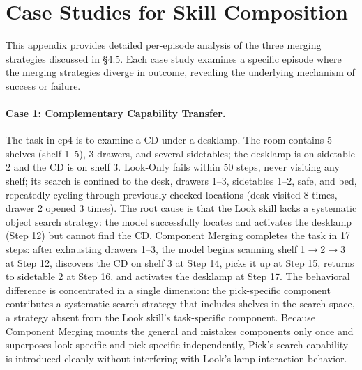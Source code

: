 \documentclass{llmxive}
\begin{document}
\section{Case Studies for Skill Composition}
\label{app:case_study}

This appendix provides detailed per-episode analysis of the three merging strategies discussed in \S4.5. Each case study examines a specific episode where the merging strategies diverge in outcome, revealing the underlying mechanism of success or failure.

\paragraph{Case 1: Complementary Capability Transfer.}
The task in ep4 is to examine a CD under a desklamp. The room contains 5 shelves (shelf 1--5), 3 drawers, and several sidetables; the desklamp is on sidetable 2 and the CD is on shelf 3. Look-Only fails within 50 steps, never visiting any shelf; its search is confined to the desk, drawers 1--3, sidetables 1--2, safe, and bed, repeatedly cycling through previously checked locations (desk visited 8 times, drawer 2 opened 3 times). The root cause is that the Look skill lacks a systematic object search strategy: the model successfully locates and activates the desklamp (Step 12) but cannot find the CD. Component Merging completes the task in 17 steps: after exhausting drawers 1--3, the model begins scanning shelf 1$\rightarrow$2$\rightarrow$3 at Step 12, discovers the CD on shelf 3 at Step 14, picks it up at Step 15, returns to sidetable 2 at Step 16, and activates the desklamp at Step 17. The behavioral difference is concentrated in a single dimension: the pick-specific component contributes a systematic search strategy that includes shelves in the search space, a strategy absent from the Look skill's task-specific component. Because Component Merging mounts the general and mistakes components only once and superposes look-specific and pick-specific independently, Pick's search capability is introduced cleanly without interfering with Look's lamp interaction behavior.
\end{document}
